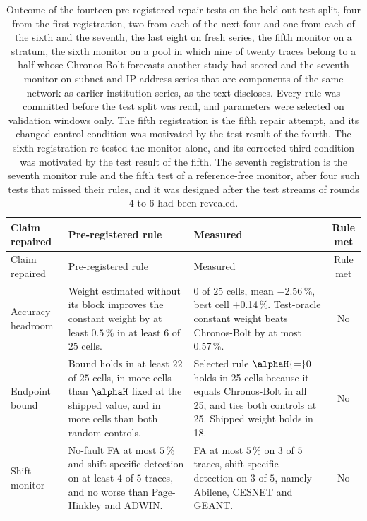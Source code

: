 {\footnotesize
\begin{longtable}{p{1.9cm} p{4.4cm} p{5.2cm} c}
\caption{Outcome of the fourteen pre-registered repair tests on the held-out test split, four from the first registration, two from each of the next four and one from each of the sixth and the seventh, the last eight on fresh series, the fifth monitor on a stratum, the sixth monitor on a pool in which nine of twenty traces belong to a half whose Chronos-Bolt forecasts another study had scored and the seventh monitor on subnet and IP-address series that are components of the same network as earlier institution series, as the text discloses. Every rule was committed before the test split was read, and parameters were selected on validation windows only. The fifth registration is the fifth repair attempt, and its changed control condition was motivated by the test result of the fourth. The sixth registration re-tested the monitor alone, and its corrected third condition was motivated by the test result of the fifth. The seventh registration is the seventh monitor rule and the fifth test of a reference-free monitor, after four such tests that missed their rules, and it was designed after the test streams of rounds 4 to 6 had been revealed.}
\label{tab:repair}\\
\toprule
Claim repaired & Pre-registered rule & Measured & Rule met \\
\midrule
\endfirsthead
\toprule
Claim repaired & Pre-registered rule & Measured & Rule met \\
\midrule
\endhead
\bottomrule
\endfoot
Accuracy headroom & Weight estimated without its block improves the constant weight by at least $0.5\,\%$ in at least $6$ of $25$ cells. & 0 of $25$ cells, mean $-$2.56\,\%, best cell $+$0.14\,\%. Test-oracle constant weight beats Chronos-Bolt by at most 0.57\,\%. & No \\
\midrule
Endpoint bound & Bound holds in at least $22$ of $25$ cells, in more cells than $\alphaH$ fixed at the shipped value, and in more cells than both random controls. & Selected rule $\alphaH{=}0$ holds in 25 cells because it equals Chronos-Bolt in all 25, and ties both controls at 25. Shipped weight holds in 18. & No \\
\midrule
Shift monitor & No-fault FA at most $5\,\%$ and shift-specific detection on at least $4$ of $5$ traces, and no worse than Page-Hinkley and ADWIN. & FA at most $5\,\%$ on 3 of $5$ traces, shift-specific detection on 3 of $5$, namely Abilene, CESNET and GEANT. & No \\

\end{longtable}}
